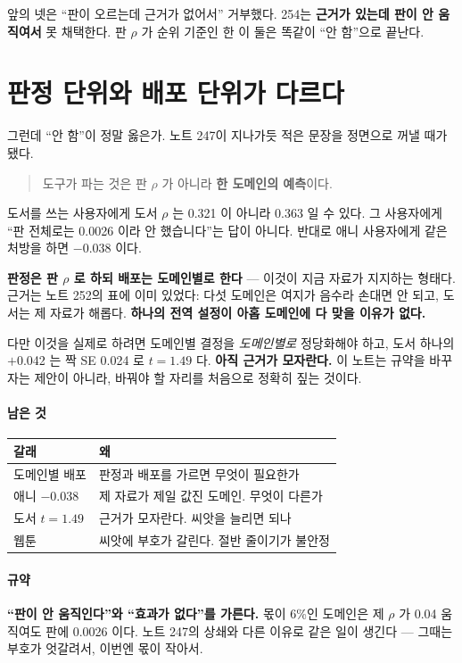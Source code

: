 \documentclass[10pt]{article}
\begin{document}
앞의 넷은 ``판이 오르는데 근거가 없어서'' 거부했다. 254는
\textbf{근거가 있는데 판이 안 움직여서} 못 채택한다. 판 $\rho$ 가 순위
기준인 한 이 둘은 똑같이 ``안 함''으로 끝난다.

\section{판정 단위와 배포 단위가 다르다}

그런데 ``안 함''이 정말 옳은가. 노트 247이 지나가듯 적은 문장을 정면으로
꺼낼 때가 됐다.

\begin{quote}\small
도구가 파는 것은 판 $\rho$ 가 아니라 \textbf{한 도메인의 예측}이다.
\end{quote}

도서를 쓰는 사용자에게 도서 $\rho$ 는 0.321 이 아니라 0.363 일 수 있다.
그 사용자에게 ``판 전체로는 0.0026 이라 안 했습니다''는 답이 아니다.
반대로 애니 사용자에게 같은 처방을 하면 $-$0.038 이다.

\textbf{판정은 판 $\rho$ 로 하되 배포는 도메인별로 한다} --- 이것이 지금
자료가 지지하는 형태다. 근거는 노트 252의 표에 이미 있었다: 다섯 도메인은
여지가 음수라 손대면 안 되고, 도서는 제 자료가 해롭다. \textbf{하나의
전역 설정이 아홉 도메인에 다 맞을 이유가 없다.}

다만 이것을 실제로 하려면 도메인별 결정을 \emph{도메인별로} 정당화해야
하고, 도서 하나의 $+$0.042 는 짝 SE 0.024 로 $t{=}1.49$ 다. \textbf{아직
근거가 모자란다.} 이 노트는 규약을 바꾸자는 제안이 아니라, 바꿔야 할
자리를 처음으로 정확히 짚는 것이다.

\paragraph{남은 것}
\begin{center}\small
\begin{tabular}{ll}
\hline
갈래 & 왜 \\
\hline
도메인별 배포 & 판정과 배포를 가르면 무엇이 필요한가 \\
애니 $-$0.038 & 제 자료가 제일 값진 도메인. 무엇이 다른가 \\
도서 $t{=}1.49$ & 근거가 모자란다. 씨앗을 늘리면 되나 \\
웹툰 & 씨앗에 부호가 갈린다. 절반 줄이기가 불안정 \\
\hline
\end{tabular}
\end{center}

\paragraph{규약} \textbf{``판이 안 움직인다''와 ``효과가 없다''를 가른다.}
몫이 6\%인 도메인은 제 $\rho$ 가 0.04 움직여도 판에 0.0026 이다. 노트 247의
상쇄와 다른 이유로 같은 일이 생긴다 --- 그때는 부호가 엇갈려서, 이번엔
몫이 작아서.
\end{document}
